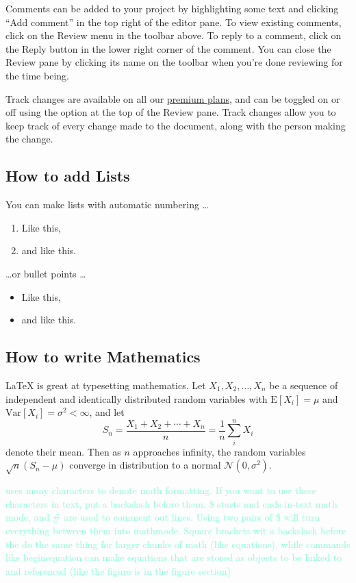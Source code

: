 \documentclass{article}
\begin{document}
Comments can be added to your project by highlighting some text and clicking ``Add comment'' in the top right of the editor pane. To view existing comments, click on the Review menu in the toolbar above. To reply to a comment, click on the Reply button in the lower right corner of the comment. You can close the Review pane by clicking its name on the toolbar when you're done reviewing for the time being.

Track changes are available on all our \href{https://www.overleaf.com/user/subscription/plans}{premium plans}, and can be toggled on or off using the option at the top of the Review pane. Track changes allow you to keep track of every change made to the document, along with the person making the change. 

\subsection{How to add Lists}

You can make lists with automatic numbering \dots

\begin{enumerate}
\item Like this,
\item and like this.
\end{enumerate}
\dots or bullet points \dots
\begin{itemize}
\item Like this,
\item and like this.
\end{itemize}

\subsection{How to write Mathematics}

\LaTeX{} is great at typesetting mathematics. Let $X_1, X_2, \ldots, X_n$ be a sequence of independent and identically distributed random variables with $\text{E}[X_i] = \mu$ and $\text{Var}[X_i] = \sigma^2 < \infty$, and let
\[S_n = \frac{X_1 + X_2 + \cdots + X_n}{n}
      = \frac{1}{n}\sum_{i}^{n} X_i\]
denote their mean. Then as $n$ approaches infinity, the random variables $\sqrt{n}(S_n - \mu)$ converge in distribution to a normal $\mathcal{N}(0, \sigma^2)$.

\textcolor{Aquamarine}{\latex uses many characters to denote math formatting. If you want to use these characters in text, put a backslash before them. \$ starts and ends in-text math mode, and \# are used to comment out lines. Using two pairs of \$ will turn everything between them into mathmode. Square brackets wit a backslash before the do the same thing for larger chunks of math (like equations), while commands like begin{equation} can make equations that are stored as objects to be linked to and referenced (like the figure is in the figure section) }
\end{document}
